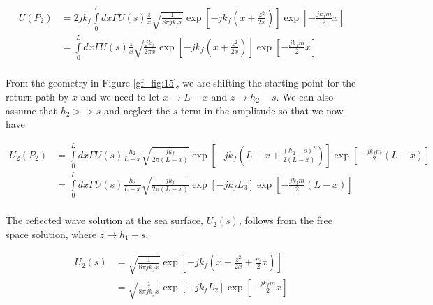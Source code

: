 \begin{equation}
\begin{aligned}
U(P_2) &= 2jk_f\int\limits_{0}^{L}dx\Gamma U(s)\frac{z}{x}\sqrt{\frac{1}{8\pi jk_f x}}\exp\left[-jk_f\left(x +\frac{z^2}{2x} \right) \right]\exp\left[-\frac{jk_fm}{2}x\right] \\
&= \int\limits_{0}^{L}dx\Gamma U(s)\frac{z}{x}\sqrt{\frac{jk_f}{2\pi x}}\exp\left[-jk_f\left(x +\frac{z^2}{2x} \right) \right]\exp\left[-\frac{jk_fm}{2}x\right] \\
\end{aligned}
\label{gf_eq:55}
\end{equation}
\renewcommand{\baselinestretch}{2} \small\normalsize

From the geometry in Figure \ref{gf_fig:15}, we are shifting the starting point for the return path by $x$ and we need to let $x \rightarrow L-x$ and $z \rightarrow h_2-s$. We can also assume that $h_2 >> s$ and neglect the $s$ term in the amplitude so that we now have

\begin{equation}
\begin{aligned}
U_2(P_2) &= \int\limits_{0}^{L}dx\Gamma U(s)\frac{h_2}{L-x}\sqrt{\frac{jk_f}{2\pi (L-x)}}\exp\left[-jk_f\left(L-x +\frac{(h_2-s)^2}{2(L-x)} \right) \right]\exp\left[-\frac{jk_fm}{2}(L-x)\right] \\
&= \int\limits_{0}^{L}dx\Gamma U(s)\frac{h_2}{L-x}\sqrt{\frac{jk_f}{2\pi (L-x)}}\exp\left[-jk_fL_3\right]\exp\left[-\frac{jk_fm}{2}(L-x)\right] \\
\end{aligned}
\label{gf_eq:56}
\end{equation}
\renewcommand{\baselinestretch}{2} \small\normalsize

The reflected wave solution at the sea surface, $U_2(s)$, follows from the free space solution, where $z \rightarrow h_1-s$.

\begin{equation}
\begin{aligned}
U_2(s) &= \sqrt{\frac{1}{8\pi jk_fx}}\exp\left[-jk_f\left(x+\frac{z^2}{2x} + \frac{m}{2}x\right)\right] \\
&=\sqrt{\frac{1}{8\pi jk_fx}}\exp\left[-jk_fL_2\right]\exp\left[-\frac{jk_fm}{2}x\right] \\
\end{aligned}
\label{gf_eq:57}
\end{equation}
\renewcommand{\baselinestretch}{2} \small\normalsize

